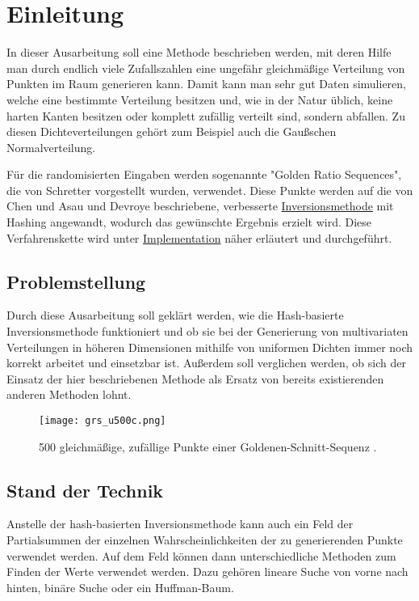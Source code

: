 \section{Einleitung}

In dieser Ausarbeitung soll eine Methode beschrieben werden, mit deren Hilfe man durch endlich viele Zufallszahlen 
eine ungefähr gleichmäßige Verteilung von Punkten im Raum generieren kann. Damit kann man sehr gut Daten simulieren, 
welche eine bestimmte Verteilung besitzen und, wie in der Natur üblich, keine harten Kanten besitzen oder komplett 
zufällig verteilt sind, sondern abfallen. Zu diesen Dichteverteilungen gehört zum Beispiel auch die Gaußschen Normalverteilung. 

Für die randomisierten Eingaben werden sogenannte "Golden Ratio Sequences", die von Schretter 
\cite{schretter-golden_ratio_sequences-2012} vorgestellt wurden, verwendet. Diese Punkte werden auf die von Chen 
und Asau \cite{chen_asau-generating_random_variates-1974} und Devroye \cite{devroye-non_uniform_random_variate-1986} 
beschriebene, verbesserte \hyperref[funktion]{Inversionsmethode} mit Hashing angewandt, wodurch das gewünschte Ergebnis 
erzielt wird. Diese Verfahrenskette wird unter \hyperref[impl]{Implementation} näher erläutert und durchgeführt. 


\subsection{Problemstellung}
Durch diese Ausarbeitung soll geklärt werden, wie die Hash-basierte Inversionsmethode funktioniert und ob  
sie bei der Generierung von multivariaten Verteilungen in höheren Dimensionen mithilfe von uniformen Dichten immer noch 
korrekt arbeitet und einsetzbar ist. Außerdem soll verglichen werden, ob sich der Einsatz der hier beschriebenen 
Methode als Ersatz von bereits existierenden anderen Methoden lohnt.

\begin{figure}
    \centering
    \texttt{[image: grs\_u500c.png]}
    \caption{500 gleichmäßige, zufällige Punkte einer Goldenen-Schnitt-Sequenz \cite{schretter-golden_ratio_sequences-2012}.}
\end{figure}

\subsection{Stand der Technik}
Anstelle der hash-basierten Inversionsmethode kann auch ein Feld der Partialsummen der einzelnen Wahrscheinlichkeiten 
der zu generierenden Punkte verwendet werden. Auf dem Feld können dann unterschiedliche Methoden zum Finden der Werte 
verwendet werden. Dazu gehören lineare Suche von vorne nach hinten, binäre Suche oder ein Huffman-Baum.

